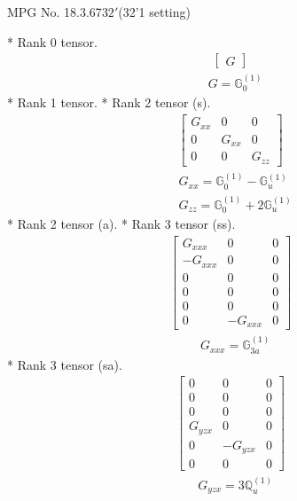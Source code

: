 \documentclass[fleqn,8pt,landscape]{jsarticle}
\begin{document}
\setcounter{MaxMatrixCols}{32}

\renewcommand{\tablename}{Table~}
\renewcommand{\figurename}{Figure~}
\begin{center}
\LARGE
MPG No. 18.3.67\quad$32'$\quad(32'1 setting)
\end{center}
* Rank 0 tensor.
\begin{align*}
\begin{bmatrix} G \end{bmatrix}
\end{align*}
\begin{align*}
& G = \mathbb{G}_{0}^{(1)}
\end{align*}
* Rank 1 tensor.
* Rank 2 tensor (s).
\begin{align*}
\begin{bmatrix} G_{xx} & 0 & 0 \\ 0 & G_{xx} & 0 \\ 0 & 0 & G_{zz} \end{bmatrix}
\end{align*}
\begin{align*}
& G_{xx} = \mathbb{G}_{0}^{(1)} - \mathbb{G}_{u}^{(1)} \\
& G_{zz} = \mathbb{G}_{0}^{(1)} + 2 \mathbb{G}_{u}^{(1)}
\end{align*}
* Rank 2 tensor (a).
* Rank 3 tensor (ss).
\begin{align*}
\begin{bmatrix} G_{xxx} & 0 & 0 \\ - G_{xxx} & 0 & 0 \\ 0 & 0 & 0 \\ 0 & 0 & 0 \\ 0 & 0 & 0 \\ 0 & - G_{xxx} & 0 \end{bmatrix}
\end{align*}
\begin{align*}
& G_{xxx} = \mathbb{G}_{3a}^{(1)}
\end{align*}
* Rank 3 tensor (sa).
\begin{align*}
\begin{bmatrix} 0 & 0 & 0 \\ 0 & 0 & 0 \\ 0 & 0 & 0 \\ G_{yzx} & 0 & 0 \\ 0 & - G_{yzx} & 0 \\ 0 & 0 & 0 \end{bmatrix}
\end{align*}
\begin{align*}
& G_{yzx} = 3 \mathbb{Q}_{u}^{(1)}
\end{align*}
\end{document}
